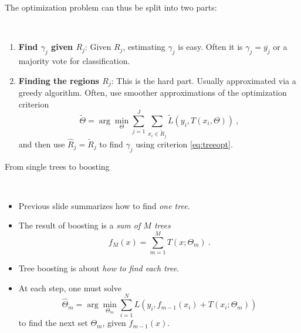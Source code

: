 \documentclass[
  10pt,
  ignorenonframetext,
]{beamer}
\providecommand{\tightlist}{%
  \setlength{\itemsep}{0pt}\setlength{\parskip}{0pt}}
\begin{document}
\begin{frame}
\label{sl:regions}

The optimization problem can thus be split into two parts:

\(~\)

\begin{enumerate}
[1)]
\tightlist
\item
  \textbf{Find \(\gamma_j\) given \(R_j\)}: Given \(R_j\), estimating
  \(\gamma_j\) is easy. Often it is \(\gamma_j=\overline{y_j}\) or a
  majority vote for classification.
\end{enumerate}

\vspace{2mm}

\begin{enumerate}
[1)]
\setcounter{enumi}{1}
\tightlist
\item
  \textbf{Finding the regions \(R_j\)}: This is the hard part. Usually
  approximated via a greedy algorithm. Often, use smoother
  approximations of the optimization criterion
  \begin{equation}\label{eq:approx}
  \tilde\Theta = \arg \min_\Theta \sum_{j=1}^J \sum_{x_i \in \tilde{R}_j} \tilde{L}(y_i,T(x_i,\Theta)) \ , 
  \end{equation} and then use \(\hat{R}_j=\tilde{R}_j\) to find
  \(\gamma_j\) using criterion \eqref{eq:treeopt}.
\end{enumerate}
\end{frame}

\begin{frame}
\begin{block}{From single trees to boosting}
\label{from-single-trees-to-boosting}
\label{sl:toBoosting}

\(~\)

\begin{itemize}
\tightlist
\item
  Previous slide summarizes how to find \emph{one tree}.
\end{itemize}

\vspace{2mm}

\begin{itemize}
\item
  The result of boosting is a \emph{sum of \(M\) trees}
  \[f_M(x) = \sum_{m=1}^M T(x;\Theta_m) \ .\] \vspace{2mm}
\item
  Tree boosting is about \emph{how to find each tree}.
\end{itemize}

\vspace{2mm}

\begin{itemize}
\tightlist
\item
  At each step, one must solve \begin{equation}\label{eq:boosted}
  \hat\Theta_m = \arg \min_{\Theta_m} \sum_{i=1}^N L\left(y_i, f_{m-1}(x_i) + T(x_i;\Theta_m)\right) 
  \end{equation} to find the next set \(\Theta_m\), given
  \(f_{m-1}(x)\).
\end{itemize}
\end{block}
\end{frame}
\end{document}
